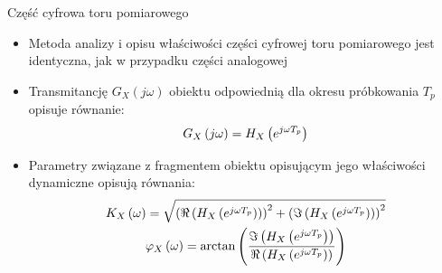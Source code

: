 \documentclass[12pt, polish, aspectratio = 169]{beamer}
\begin{document}
\begin{frame}{Część cyfrowa toru pomiarowego}
\begin{itemize}
\item Metoda analizy i opisu właściwości części cyfrowej toru pomiarowego jest identyczna, jak w przypadku części analogowej
\item Transmitancję $G_{X}(j\omega)$ obiektu odpowiednią dla okresu próbkowania $T_{p}$ opisuje równanie:
\begin{equation}
G_{X} \left(j\omega\right) = H_{X} \left(e^{j\omega T_{p}}\right) \label{eq:trans_disc_tocont}
\end{equation}
\item Parametry związane z fragmentem obiektu opisującym jego właściwości dynamiczne opisują równania:
\begin{gather}
K_{X} \left(\omega\right) = \sqrt{\left( \Re \left( H_{X} \left(e^{j\omega T_{p}}\right) \right) \right)^{2} + \left( \Im \left( H_{X} \left(e^{j\omega T_{p}}\right) \right) \right)^{2}} \label{eq:mid_disc_amp} \\
\varphi_{X} \left(\omega\right) = \arctan \left( \frac{\Im \left( H_{X} \left(e^{j\omega T_{p}}\right) \right)}{\Re \left( H_{X} \left(e^{j\omega T_{p}}\right) \right)} \right) \label{eq:mid_disc_phi}
\end{gather}
\end{itemize}
\end{frame}
\end{document}
